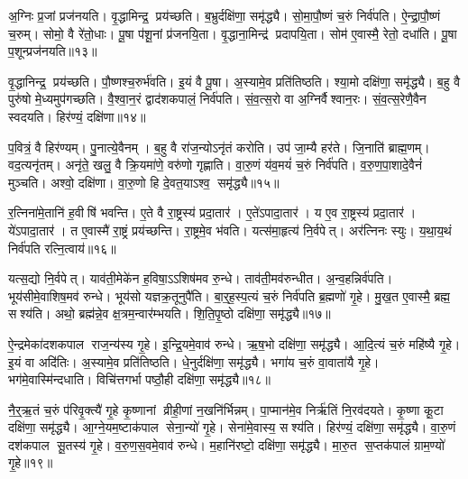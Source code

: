 अ॒ग्निः प्र॒जां प्रज॑नयति।
वृ॒द्धामिन्द्र॒ प्रय॑च्छति।
ब॒भ्रुर्दक्षि॑णा॒ समृ॑द्ध्यै।
सो॒मा॒पौ॒ष्णं च॒रुं निर्व॑पति।
ऐ॒न्द्रा॒पौ॒ष्णं च॒रुम्।
सोमो॒ वै रे॑तो॒धाः।
पू॒षा प॑शू॒नां प्र॑जनयि॒ता।
वृ॒द्धाना॒मिन्द्र॑ प्रदापयि॒ता।
सोम॑ ए॒वास्मै॒ रेतो॒ दधा॑ति।
पू॒षा प॒शून्प्रज॑नयति॥१३॥

वृ॒द्धानिन्द्र॒ प्रय॑च्छति।
पौ॒ष्णश्च॒रुर्भ॑वति।
इ॒यं वै पू॒षा।
अ॒स्यामे॒व प्रति॑तिष्ठति।
श्या॒मो दक्षि॑णा॒ समृ॑द्ध्यै।
ब॒हु वै पुरु॑षो मे॒ध्यमुप॑गच्छति।
वै॒श्वा॒न॒रं द्वाद॑शकपालं॒ निर्व॑पति।
सं॒व॒त्स॒रो वा अ॒ग्निर्वैश्वान॒रः।
सं॒व॒त्स॒रेणै॒वैन स्वदयति।
हिर॑ण्यं॒ दक्षि॑णा॥१४॥

प॒वित्रं॒ वै हिर॑ण्यम्।
पु॒नात्ये॒वैनम्।
ब॒हु वै रा॑ज॒न्योऽनृ॑तं करोति।
उप॑ जा॒म्यै हर॑ते।
जि॒नाति॑ ब्राह्म॒णम्।
वद॒त्यनृ॑तम्।
अनृ॑ते॒ खलु॒ वै क्रि॒यमा॑णे॒ वरु॑णो गृह्णाति।
वा॒रु॒णं य॑व॒मयं॑ च॒रुं निर्व॑पति।
व॒रु॒ण॒पा॒शादे॒वैनं॑ मुञ्चति।
अश्वो॒ दक्षि॑णा।
वा॒रु॒णो हि दे॒वत॒याऽश्व॒ समृ॑द्ध्यै॥१५॥

र॒त्निना॑मे॒तानि॑ ह॒वीषि॑ भवन्ति।
ए॒ते वै रा॒ष्ट्रस्य॑ प्रदा॒तार॑।
ए॒ते॑ऽपादा॒तार॑।
य ए॒व रा॒ष्ट्रस्य॑ प्रदा॒तार॑।
ये॑ऽपादा॒तार॑।
त ए॒वास्मै॑ रा॒ष्ट्रं प्रय॑च्छन्ति।
रा॒ष्ट्रमे॒व भ॑वति।
यत्स॑मा॒हृत्य॑ नि॒र्वपेत्।
अर॑त्निनः स्युः।
य॒था॒य॒थं निर्व॑पति रत्नि॒त्वाय॑॥१६॥

यत्स॒द्यो नि॒र्वपेत्।
याव॑ती॒मेके॑न ह॒विषा॒ऽऽशिष॑मव रु॒न्धे।
ताव॑ती॒मव॑रुन्धीत।
अ॒न्व॒हन्निर्व॑पति।
भूय॑सीमे॒वाशिष॒मव॑ रुन्धे।
भूय॑सो यज्ञक्र॒तूनुपै॑ति।
बा॒र्॒ह॒स्प॒त्यं च॒रुं निर्व॑पति ब्र॒ह्मणो॑ गृ॒हे।
मु॒ख॒त ए॒वास्मै॒ ब्रह्म॒ सश्य॑ति।
अथो॒ ब्रह्म॑न्ने॒व क्ष॒त्रम॒न्वार॑म्भयति।
शि॒ति॒पृ॒ष्ठो दक्षि॑णा॒ समृ॑द्ध्यै॥१७॥

ऐ॒न्द्रमेका॑दशकपाल राज॒न्य॑स्य गृ॒हे।
इ॒न्द्रि॒यमे॒वाव॑ रुन्धे।
ऋ॒ष॒भो दक्षि॑णा॒ समृ॑द्ध्यै।
आ॒दि॒त्यं च॒रुं महि॑ष्यै गृ॒हे।
इ॒यं वा अदि॑तिः।
अ॒स्यामे॒व प्रति॑तिष्ठति।
धे॒नुर्दक्षि॑णा॒ समृ॑द्ध्यै।
भगा॑य च॒रुं वा॒वाता॑यै गृ॒हे।
भग॑मे॒वास्मि॑न्दधाति।
विचि॑त्तगर्भा पष्ठौ॒ही दक्षि॑णा॒ समृ॑द्ध्यै॥१८॥

नै॒र्॒ऋ॒तं च॒रुं प॑रिवृ॒क्त्यै॑ गृ॒हे कृ॒ष्णानां व्रीही॒णां न॒खनि॑र्भिन्नम्।
पा॒प्मान॑मे॒व निर्\mbox{}ऋ॑तिं नि॒रव॑दयते।
कृ॒ष्णा कू॒टा दक्षि॑णा॒ समृ॑द्ध्यै।
आ॒ग्ने॒यम॒ष्टाक॑पाल सेना॒न्यो॑ गृ॒हे।
सेना॑मे॒वास्य॒ सश्य॑ति।
हिर॑ण्यं॒ दक्षि॑णा॒ समृ॑द्ध्यै।
वा॒रु॒णं दश॑कपाल सू॒तस्य॑ गृ॒हे।
व॒रु॒ण॒स॒वमे॒वाव॑ रुन्धे।
म॒हानि॑रष्टो॒ दक्षि॑णा॒ समृ॑द्ध्यै।
मा॒रु॒त स॒प्तक॑पालं ग्राम॒ण्यो॑ गृ॒हे॥१९॥

